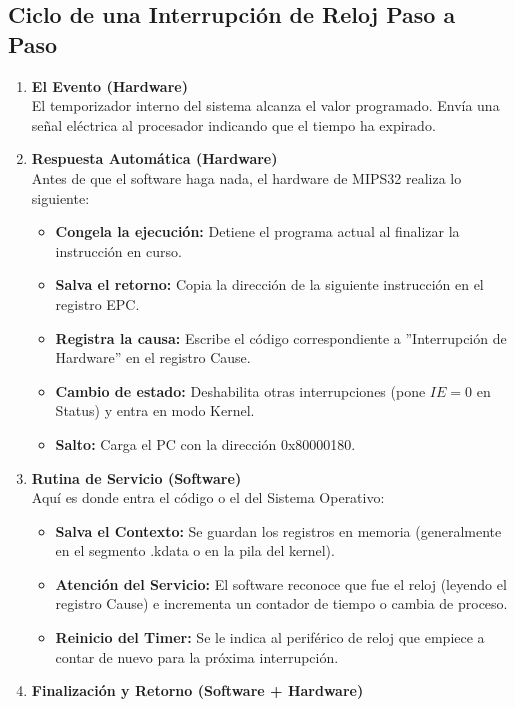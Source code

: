 \documentclass[]{article}
\begin{document}
	\subsection{Ciclo de una Interrupción de Reloj Paso a Paso}
		\begin{enumerate}
			\item \textbf{El Evento (Hardware)}\\
				El temporizador interno del sistema alcanza el valor programado. Envía una señal eléctrica al procesador indicando que el tiempo ha expirado.
			\item \textbf{Respuesta Automática (Hardware)}\\
				Antes de que el software haga nada, el hardware de MIPS32 realiza lo siguiente:
				\begin{itemize}
					\item \textbf{Congela la ejecución:} Detiene el programa actual al finalizar la instrucción en curso.
					\item \textbf{Salva el retorno:} Copia la dirección de la siguiente instrucción en el registro EPC.
					\item \textbf{Registra la causa:} Escribe el código correspondiente a ''Interrupción de Hardware'' en el registro Cause.
					\item \textbf{Cambio de estado:} Deshabilita otras interrupciones (pone $IE=0$ en Status) y entra en modo Kernel.
					\item \textbf{Salto:} Carga el PC con la dirección 0x80000180.
				\end{itemize}
			\item \textbf{Rutina de Servicio (Software)}\\
				Aquí es donde entra el código o el del Sistema Operativo:
				\begin{itemize}
					\item \textbf{Salva el Contexto:} Se guardan los registros en memoria (generalmente en el segmento .kdata o en la pila del kernel).
					\item \textbf{Atención del Servicio:} El software reconoce que fue el reloj (leyendo el registro Cause) e incrementa un contador de tiempo o cambia de proceso.
					\item \textbf{Reinicio del Timer:} Se le indica al periférico de reloj que empiece a contar de nuevo para la próxima interrupción.
				\end{itemize}
			\item \textbf{Finalización y Retorno (Software + Hardware)}\\

\end{enumerate}
\end{document}
